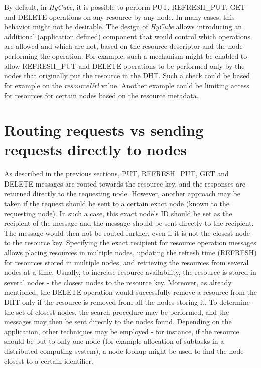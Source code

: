 By default, in \emph{HyCube}, it is possible to perform PUT, REFRESH\_PUT, GET and DELETE operations on any resource by any node. In many cases, this behavior might not be desirable. The design of \emph{HyCube} allows introducing an additional (application defined) component that would control which operations are allowed and which are not, based on the resource descriptor and the node performing the operation. For example, such a mechanism might be enabled to allow REFRESH\_PUT and DELETE operations to be performed only by the nodes that originally put the resource in the DHT. Such a check could be based for example on the \emph{resourceUrl} value. Another example could be limiting access for resources for certain nodes based on the resource metadata.




\section{Routing requests vs sending requests directly to nodes}

As described in the previous sections, PUT, REFRESH\_PUT, GET and DELETE messages are routed towards the resource key, and the responses are returned directly to the requesting node. However, another approach may be taken if the request should be sent to a certain exact node (known to the requesting node). In such a case, this exact node's ID should be set as the recipient of the message and the message should be sent directly to the recipient. The message would then not be routed further, even if it is not the closest node to the resource key. Specifying the exact recipient for resource operation messages allows placing resources in multiple nodes, updating the refresh time (REFRESH) for resources stored in multiple nodes, and retrieving the resources from several nodes at a time. Usually, to increase resource availability, the resource is stored in several nodes - the closest nodes to the resource key. Moreover, as already mentioned, the DELETE operation would successfully remove a resource from the DHT only if the resource is removed from all the nodes storing it. To determine the set of closest nodes, the search procedure may be performed, and the messages may then be sent directly to the nodes found. Depending on the application, other techniques may be employed - for instance, if the resource should be put to only one node (for example allocation of subtasks in a distributed computing system), a node lookup might be used to find the node closest to a certain identifier.

